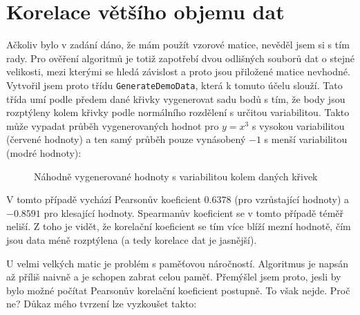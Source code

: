 \section*{Korelace většího objemu dat}
Ačkoliv bylo v zadání dáno, že mám použít vzorové matice, nevěděl jsem si s tím rady. Pro ověření algoritmů je totiž zapotřebí dvou odlišných souborů dat o stejné velikosti, mezi kterými se hledá závislost a proto jsou přiložené matice nevhodné. Vytvořil jsem proto třídu \texttt{GenerateDemoData}, která k tomuto účelu slouží. Tato třída umí podle předem dané křivky vygenerovat sadu bodů s tím, že body jsou rozptýleny kolem křivky podle normálního rozdělení s určitou variabilitou. Takto může vypadat průběh vygenerovaných hodnot pro $y=x^3$ s vysokou variabilitou (červené hodnoty) a ten samý průběh pouze vynásobený $-1$ s menší variabilitou (modré hodnoty):

\begin{figure}[H]
    \centering
	\caption{Náhodně vygenerované hodnoty s variabilitou kolem daných křivek} %
	\label{fig:random}
\end{figure}

V tomto případě vychází Pearsonův koeficient $0.6378$ (pro vzrůstající hodnoty) a $-0.8591$ pro klesající hodnoty. Spearmanův koeficient se v tomto případě téměř neliší. Z toho je vidět, že korelační koeficient se tím více blíží mezní hodnotě, čím jsou data méně rozptýlena (a tedy korelace dat je jasnější).

U velmi velkých matic je problém s paměťovou náročností. Algoritmus je napsán až příliš naivně a je schopen zabrat celou paměť. Přemýšlel jsem proto, jesli by bylo možné počítat Pearsonův korelační koeficient postupně. To však nejde. Proč ne? Důkaz mého tvrzení lze vyzkoušet takto:

